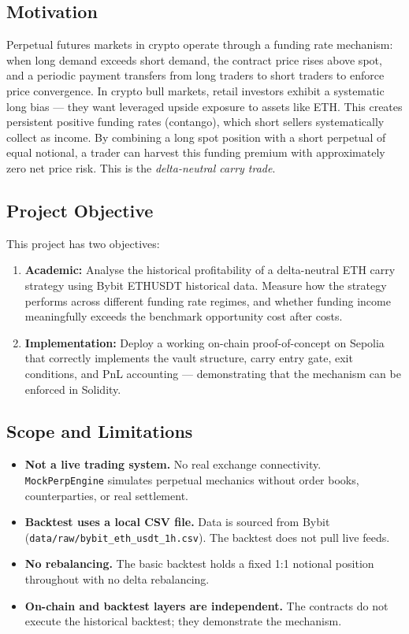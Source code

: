 \documentclass[11pt,a4paper]{article}
\begin{document}
\subsection{Motivation}

Perpetual futures markets in crypto operate through a funding rate mechanism: when long demand exceeds short demand, the contract price rises above spot, and a periodic payment transfers from long traders to short traders to enforce price convergence. In crypto bull markets, retail investors exhibit a systematic long bias --- they want leveraged upside exposure to assets like ETH. This creates persistent positive funding rates (contango), which short sellers systematically collect as income. By combining a long spot position with a short perpetual of equal notional, a trader can harvest this funding premium with approximately zero net price risk. This is the \emph{delta-neutral carry trade}.

\subsection{Project Objective}

This project has two objectives:

\begin{enumerate}
    \item \textbf{Academic:} Analyse the historical profitability of a delta-neutral ETH carry strategy using Bybit ETHUSDT historical data. Measure how the strategy performs across different funding rate regimes, and whether funding income meaningfully exceeds the benchmark opportunity cost after costs.

    \item \textbf{Implementation:} Deploy a working on-chain proof-of-concept on Sepolia that correctly implements the vault structure, carry entry gate, exit conditions, and PnL accounting --- demonstrating that the mechanism can be enforced in Solidity.
\end{enumerate}

\subsection{Scope and Limitations}

\begin{itemize}
    \item \textbf{Not a live trading system.} No real exchange connectivity. \texttt{MockPerpEngine} simulates perpetual mechanics without order books, counterparties, or real settlement.
    \item \textbf{Backtest uses a local CSV file.} Data is sourced from Bybit (\texttt{data/raw/bybit\_eth\_usdt\_1h.csv}). The backtest does not pull live feeds.
    \item \textbf{No rebalancing.} The basic backtest holds a fixed 1:1 notional position throughout with no delta rebalancing.
    \item \textbf{On-chain and backtest layers are independent.} The contracts do not execute the historical backtest; they demonstrate the mechanism.
\end{itemize}
\end{document}
